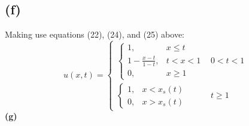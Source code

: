 \documentclass{article}
\begin{document}
\subsection*{(f)}
Making use equations (22), (24), and (25) above:
\begin{equation}
  u(x,t)=
  \begin{cases}
    \begin{cases}
      1, & x \leq t \\
      1 - \frac{x-t}{1-t}, & t < x < 1\\
      0, & x \geq 1
    \end{cases}
    &0 < t < 1\\
    \begin{cases}
      1,  & x < x_s(t) \\
      0,  & x > x_s(t)
    \end{cases}
    &t\geq 1
  \end{cases}
\end{equation}
\textbf{(g)}
\end{document}

